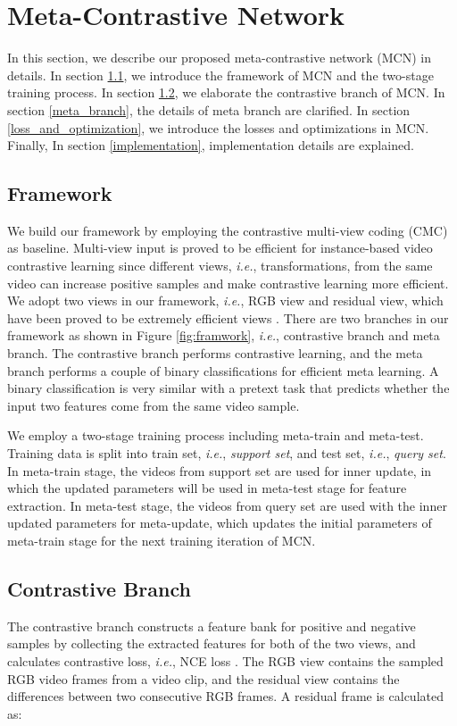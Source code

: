 \documentclass[10pt,twocolumn,letterpaper]{article}
\begin{document}
\section{Meta-Contrastive Network}
In this section, we describe our proposed meta-contrastive network (MCN) in details. In section \ref{framwork}, we introduce the framework of MCN and the two-stage training process. In section \ref{main_branch}, we elaborate the contrastive branch of MCN. In section \ref{meta_branch}, the details of meta branch are clarified. In section \ref{loss_and_optimization}, we introduce the losses and optimizations in MCN. Finally, In section \ref{implementation}, implementation details are explained.

\subsection{Framework}
\label{framwork}
We build our framework by employing the contrastive multi-view coding (CMC) \cite{tian2019contrastive} as baseline. Multi-view input is proved to be efficient for instance-based video contrastive learning since different views, \textit{i.e.}, transformations, from the same video can increase positive samples and make contrastive learning more efficient. We adopt two views in our framework, \textit{i.e.}, RGB view and residual view, which have been proved to be extremely efficient views \cite{tao2020rethinking}. There are two branches in our framework as shown in Figure \ref{fig:framwork}, \textit{i.e.}, contrastive branch and meta branch. The contrastive branch performs contrastive learning, and the meta branch performs a couple of binary classifications for efficient meta learning. A binary classification is very similar with a pretext task that predicts whether the input two features come from the same video sample. 

We employ a two-stage training process including meta-train and meta-test. Training data is split into train set, \textit{i.e.}, \textit{support set}, and test set, \textit{i.e.}, \textit{query set}. In meta-train stage, the videos from support set are used for inner update, in which the updated parameters will be used in meta-test stage for feature extraction. In meta-test stage, the videos from query set are used with the inner updated parameters for meta-update, which updates the initial parameters of meta-train stage for the next training iteration of MCN. 

\subsection{Contrastive Branch}
\label{main_branch}
The contrastive branch constructs a feature bank for positive and negative samples by collecting the extracted features for both of the two views, and calculates contrastive loss, \textit{i.e.}, NCE loss \cite{gutmann2010noise}. The RGB view contains the sampled RGB video frames from a video clip, and the residual view contains the differences between two consecutive RGB frames. A residual frame is calculated as:
\end{document}
